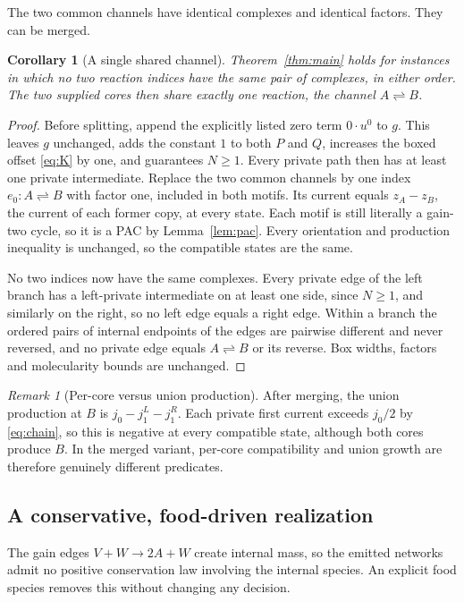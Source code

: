 \documentclass[11pt,a4paper]{article}
\theoremstyle{plain}
\newtheorem{corollary}[theorem]{Corollary}
\theoremstyle{definition}
\theoremstyle{remark}
\newtheorem{remark}[theorem]{Remark}
\newcommand{\rev}{\rightleftharpoons}
\begin{document}
The two common channels have identical complexes and identical factors. They can be merged.

\begin{corollary}[A single shared channel]\label{cor:merged}
Theorem~\ref{thm:main} holds for instances in which no two reaction indices have the same pair of complexes, in either order. The two supplied cores then share exactly one reaction, the channel $A\rev B$.
\end{corollary}

\begin{proof}
Before splitting, append the explicitly listed zero term $0\cdot u^{0}$ to $g$. This leaves $g$ unchanged, adds the constant $1$ to both $P$ and $Q$, increases the boxed offset \eqref{eq:K} by one, and guarantees $N\ge1$. Every private path then has at least one private intermediate. Replace the two common channels by one index $e_0:A\rev B$ with factor one, included in both motifs. Its current equals $z_A-z_B$, the current of each former copy, at every state. Each motif is still literally a gain-two cycle, so it is a PAC by Lemma~\ref{lem:pac}. Every orientation and production inequality is unchanged, so the compatible states are the same.

No two indices now have the same complexes. Every private edge of the left branch has a left-private intermediate on at least one side, since $N\ge1$, and similarly on the right, so no left edge equals a right edge. Within a branch the ordered pairs of internal endpoints of the edges are pairwise different and never reversed, and no private edge equals $A\rev B$ or its reverse. Box widths, factors and molecularity bounds are unchanged.
\end{proof}

\begin{remark}[Per-core versus union production]\label{rem:merged}
After merging, the union production at $B$ is $j_0-j^L_1-j^R_1$. Each private first current exceeds $j_0/2$ by \eqref{eq:chain}, so this is negative at every compatible state, although both cores produce $B$. In the merged variant, per-core compatibility and union growth are therefore genuinely different predicates.
\end{remark}

\subsection{A conservative, food-driven realization}

The gain edges $V+W\to2A+W$ create internal mass, so the emitted networks admit no positive conservation law involving the internal species. An explicit food species removes this without changing any decision.
\end{document}
